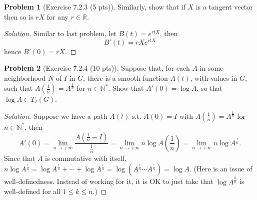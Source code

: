 \documentclass{article}
\theoremstyle{definition}
\newtheorem{problem}{Problem}
\theoremstyle{plain}
\begin{document}
\begin{problem}[Exercise 7.2.3 (5 pts)]
Similarly, show that if $X$ is a tangent vector then so is $rX$ for any $r\in\mathbb{R}$.
\end{problem}
\begin{adjustwidth}{0.7cm}{}
\color{blue}
\begin{proof}[Solution]
Similar to last problem, let $B(t)=e^{rtX}$, then
\begin{displaymath}
B'(t)=rXe^{rtX}
\end{displaymath}
hence $B'(0)=rX$.
\color{black}
\end{proof}
\end{adjustwidth}

\begin{problem}[Exercise 7.2.4 (10 pts)]
Suppose that, for each $A$ in some neighborhood $N$ of $I$ in $G$, there is a smooth function $A(t)$, with values in $G$, such that $A(\frac{1}{n})=A^{\frac{1}{n}}$ for $n\in\mathbb{N}^*$. Show that $A'(0)=\log A$, so that $\log A\in T_I(G)$.
\end{problem}
\begin{adjustwidth}{0.7cm}{}
\color{blue}
\begin{proof}[Solution]
Suppose we have a path $A(t)$ s.t. $A(0)=I$ with $A(\frac{1}{n})=A^{\frac{1}{n}}$ for $n\in\mathbb{N}^*$, then
\begin{displaymath}
A'(0)=\lim_{n\to+\infty}\frac{A(\frac{1}{n}-I)}{\frac{1}{n}}=\lim_{n\to+\infty}n\log A(\frac{1}{n})=\lim_{n\to+\infty}n\log A^{\frac{1}{n}}.
\end{displaymath}
Since that $A$ is commutative with itself, $n\log A^{\frac{1}{n}}=\log A^{\frac{1}{n}}+\cdots+\log A^{\frac{1}{n}}=\log(A^{\frac{1}{n}}\cdots A^{\frac{1}{n}})=\log A$. (Here is an issue of well-definedness. Instead of working for it, it is OK to just take that $\log A^{\frac{k}{n}}$ is well-defined for all $1\leq k\leq n$.)
\color{black}
\end{proof}
\end{adjustwidth}
\end{document}
